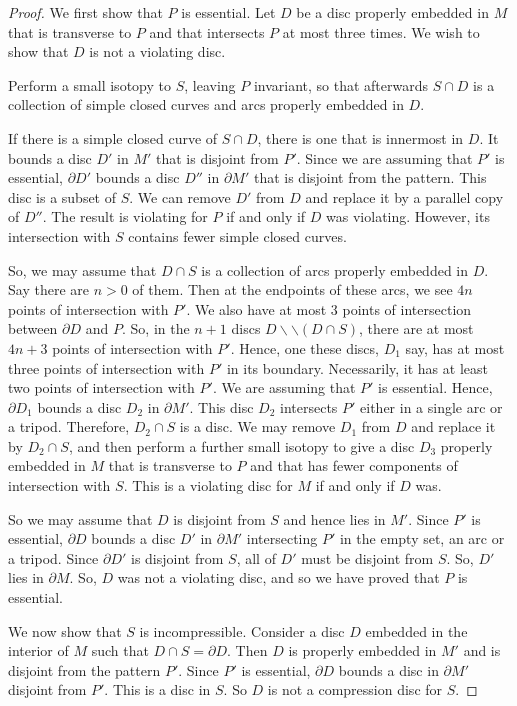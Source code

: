 \documentclass[oneside]{amsart}
\numberwithin{equation}{section}
\theoremstyle{plain}
\theoremstyle{definition}
\newcommand{\cut}{\backslash\backslash}
\begin{document}
\begin{proof}
We first show that $P$ is essential.
Let $D$ be a disc properly embedded in $M$ that is transverse to $P$ and that intersects $P$ at most three times. We wish to show that $D$ is not a violating disc.

Perform a small isotopy to $S$, leaving $P$ invariant, so that afterwards $S \cap D$ is a collection of simple closed curves and arcs properly embedded in $D$. 

If there is a simple closed curve of $S \cap D$, there is one that is innermost in $D$. It bounds a disc $D'$ in $M'$ that is disjoint from $P'$. Since we are assuming that $P'$ is essential, $\partial D'$ bounds a disc $D''$ in $\partial M'$ that is disjoint  from the pattern. This disc is a subset of $S$. We can remove $D'$ from $D$ and replace it by a parallel copy of $D''$. The result is violating for $P$ if and only if $D$ was violating. However, its intersection with $S$ contains fewer simple closed curves.

So, we may assume that $D \cap S$ is a collection of arcs properly embedded in $D$. Say there are $n>0$ of them. Then at the endpoints of these arcs, we see $4n$ points of intersection with $P'$. We also have at most $3$ points of intersection between $\partial D$ and $P$. So, in the $n+1$ discs $D \cut (D \cap S)$, there are at most $4n+3$ points of intersection with $P'$. Hence, one these discs, $D_1$ say, has at most three points of intersection with $P'$ in its boundary. Necessarily, it has at least two points of intersection with $P'$. We are assuming that $P'$ is essential. Hence, $\partial D_1$ bounds a disc $D_2$ in $\partial M'$. This disc $D_2$ intersects $P'$ either in a single arc or a tripod. Therefore, $D_2\cap S$ is a disc. We may remove $D_1$ from $D$ and replace it by $D_2 \cap S$, and then perform a further small isotopy to give a disc $D_3$ properly embedded in $M$ that is transverse to $P$ and that has fewer components of intersection with $S$. This is a violating disc for $M$ if and only if $D$ was.

So we may assume that $D$ is disjoint from $S$ and hence lies in $M'$. Since $P'$ is essential, $\partial D$ bounds a disc $D'$ in $\partial M'$ intersecting $P'$ in the empty set, an arc or a tripod. Since $\partial D'$ is disjoint from $S$, all of $D'$ must be disjoint from $S$. So, $D'$ lies in $\partial M$. So, $D$ was not a violating disc, and so we have proved that $P$ is essential. 

We now show that $S$ is incompressible. Consider a disc $D$ embedded in the interior of $M$ such that $D \cap S = \partial D$. Then $D$ is properly embedded in $M'$ and is disjoint from the pattern $P'$. Since $P'$ is essential, $\partial D$ bounds a disc in $\partial M'$ disjoint from $P'$. This is a disc in $S$. So $D$ is not a compression disc for $S$.


\end{proof}
\end{document}
